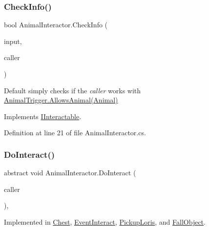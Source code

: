 \subsubsection{\texorpdfstring{Check\+Info()}{CheckInfo()}}
{\footnotesize\ttfamily bool Animal\+Interactor.\+Check\+Info (\begin{DoxyParamCaption}\item[{Input\+Control}]{input,  }\item[{\mbox{\hyperlink{class_animal}{Animal}}}]{caller }\end{DoxyParamCaption})}



Default simply checks if the {\itshape caller}  works with \mbox{\hyperlink{class_animal_trigger_ae8394dfcf5f91b8c413959a4d6baa3a9}{Animal\+Trigger.\+Allows\+Animal(\+Animal)}} 



Implements \mbox{\hyperlink{interface_i_interactable_a5142ebbddd5d91a93da436941ad77d8e}{I\+Interactable}}.



Definition at line 21 of file Animal\+Interactor.\+cs.

\mbox{\label{class_animal_interactor_a522811ab410a5acbc12362e29263c5a8}} 
\subsubsection{\texorpdfstring{Do\+Interact()}{DoInteract()}}
{\footnotesize\ttfamily abstract void Animal\+Interactor.\+Do\+Interact (\begin{DoxyParamCaption}\item[{\mbox{\hyperlink{class_animal}{Animal}}}]{caller }\end{DoxyParamCaption})\hspace{0.3cm}{\ttfamily [protected]}, {}}



Implemented in \mbox{\hyperlink{class_chest_a61fad29e7dd236a2fbfce7b9c2e51841}{Chest}}, \mbox{\hyperlink{class_event_interact_a42b9c48803be9e90086d545a07fb1b74}{Event\+Interact}}, \mbox{\hyperlink{class_pickup_loris_ab6d5a9254471e0936b93d0b3a0cbd69c}{Pickup\+Loris}}, and \mbox{\hyperlink{class_fall_object_a5d796a5c10e490ce3bb5356b49eaae29}{Fall\+Object}}.

